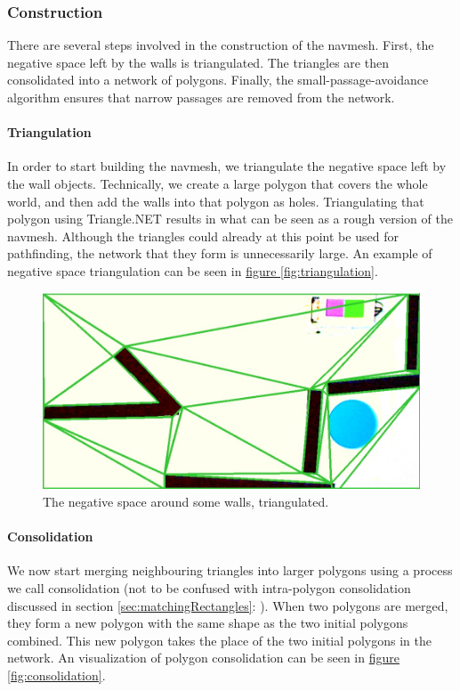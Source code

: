 \documentclass[10pt, abstracton, twocolumn]{scrartcl}
\newcommand{\fref}[1]{\hyperref[#1]{figure \vref{#1}}}
\newcommand{\sref}[1]{section \vref{#1}: \nameref{#1}}
\begin{document}
\subsubsection{Construction}
There are several steps involved in the construction of the navmesh. First, the negative space left by the walls is triangulated. The triangles are then consolidated into a network of polygons. Finally, the small-passage-avoidance algorithm ensures that narrow passages are removed from the network.

\paragraph{Triangulation}
In order to start building the navmesh, we triangulate the negative space left by the wall objects. Technically, we create a large polygon that covers the whole world, and then add the walls into that polygon as holes. Triangulating that polygon using Triangle.NET results in what can be seen as a rough version of the navmesh. Although the triangles could already at this point be used for pathfinding, the network that they form is unnecessarily large. An example of negative space triangulation can be seen in \fref{fig:triangulation}.

\begin{figure}
        \centering
        \includegraphics[width=\columnwidth]{pictures/triangulation.png}
        \caption{\small The negative space around some walls, triangulated.}
        \label{fig:triangulation}
\end{figure}

\paragraph{Consolidation}
We now start merging neighbouring triangles into larger polygons using a process we call consolidation (not to be confused with intra-polygon consolidation discussed in \sref{sec:matchingRectangles}). When two polygons are merged, they form a new polygon with the same shape as the two initial polygons combined. This new polygon takes the place of the two initial polygons in the network. An visualization of polygon consolidation can be seen in \fref{fig:consolidation}.
\end{document}
